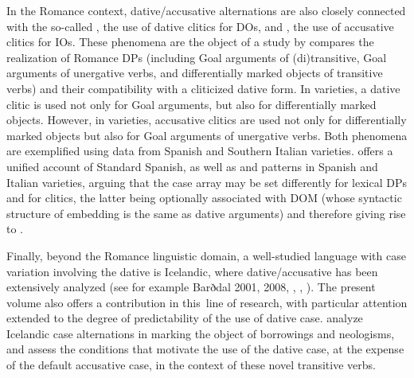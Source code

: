 \begin{styleBodyA}
In the Romance context, dative/accusative alternations are also closely connected with the so-called , the use of dative clitics for DOs, and , the use of accusative clitics for IOs. These phenomena are the object of a study by compares the realization of Romance DPs (including Goal arguments of (di)transitive, Goal arguments of unergative verbs, and differentially marked objects of transitive verbs) and their compatibility with a cliticized dative form. In varieties, a dative clitic is used not only for Goal arguments, but also for differentially marked objects. However, in  varieties, accusative clitics are used not only for differentially marked objects but also for Goal arguments of unergative verbs. Both phenomena are exemplified using data from Spanish and Southern Italian varieties.  offers a unified account of Standard Spanish, as well as  and  patterns in Spanish and Italian varieties, arguing that the case array may be set differently for lexical DPs and for clitics, the latter being optionally associated with DOM (whose syntactic structure of embedding is the same as  dative arguments) and therefore giving rise to .
\end{styleBodyA}

\begin{styleNormalWeb}
Finally, beyond the Romance linguistic domain, a well-studied language with case variation involving the dative is Icelandic, where dative/accusative has been extensively analyzed (see for example Barðdal 2001, 2008, \citealt{Svenonius2002}, \citealt{Maling2002}, \citealt{JónssonEythórsson2005}). The present volume also offers a contribution in this~line of research, with particular attention extended to the degree of predictability of the use of dative case.  analyze Icelandic case alternations in marking the object of borrowings and neologisms, and assess the conditions that motivate the use of the dative case, at the expense of the default accusative case, in the context of these novel transitive verbs. 
\end{styleNormalWeb}

